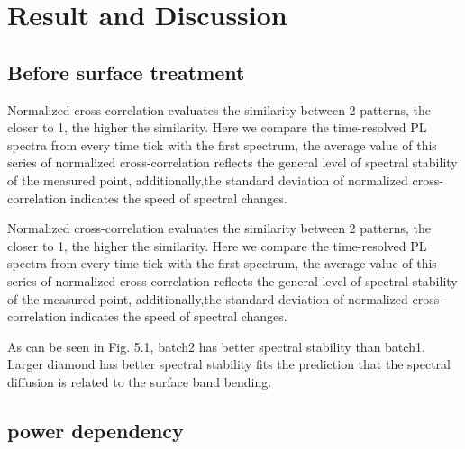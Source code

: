 \chapter{Result and Discussion} %

\label{Chapter2.75} %

\section{Before surface treatment}

Normalized cross-correlation evaluates the similarity between 2 patterns, the closer to 1, the higher the similarity. Here we compare the time-resolved PL spectra from every time tick with the first spectrum, the average value of this series of normalized cross-correlation reflects the general level of spectral stability of the measured point, additionally,the standard deviation of normalized cross-correlation indicates the speed of spectral changes.



Normalized cross-correlation evaluates the similarity between 2 patterns, the closer to 1, the higher the similarity. Here we compare the time-resolved PL spectra from every time tick with the first spectrum, the average value of this series of normalized cross-correlation reflects the general level of spectral stability of the measured point, additionally,the standard deviation of normalized cross-correlation indicates the speed of spectral changes.

As can be seen in Fig. 5.1, batch2 has better spectral stability than batch1. Larger diamond has better spectral stability fits the prediction that the spectral diffusion is related to the surface band bending. 

\section{power dependency}

